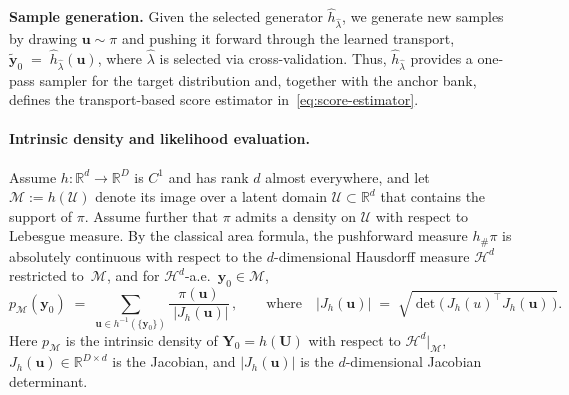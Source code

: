 \documentclass[12pt]{article}
\theoremstyle{definition} %
\newcommand{\M}{\mathcal{M}}
\newcommand{\U}{\bm U}
\newcommand{\Y}{\bm Y}
\newcommand{\y}{\bm y}
\begin{document}
\noindent\textbf{Sample generation.}
Given the selected generator $\hat h_{\hat\lambda}$, we generate new samples by drawing
$\bm u \sim \pi$ and pushing it forward through the learned transport,
$\tilde{\y}_0 \;=\; \hat h_{\hat\lambda}(\bm u)$,
where $\hat\lambda$ is selected via cross-validation.
Thus, $\hat h_{\hat\lambda}$ provides a one-pass sampler for the target distribution and, together with the anchor bank, defines the transport-based score estimator in~\eqref{eq:score-estimator}.

\paragraph{Intrinsic density and likelihood evaluation.}
Assume $h:\mathbb{R}^{d}\to\mathbb{R}^D$ is $C^1$ and has rank $d$ almost everywhere, and let $\M:=h(\mathcal{U})$ denote its image over a latent domain $\mathcal{U}\subset\mathbb{R}^{d}$ that contains the support of $\pi$.
Assume further that $\pi$ admits a density on $\mathcal{U}$ with respect to Lebesgue measure.
By the classical area formula, the pushforward measure $h_{\#}\pi$ is absolutely continuous with respect to the $d$-dimensional Hausdorff measure $\mathcal H^{d}$ restricted to~$\M$, and for $\mathcal H^{d}$-a.e.\ $\y_0\in\M$,
\begin{equation}
\label{eq:manifold-likelihood}
p_\M(\y_0)\;=\;\sum_{\bm u\in h^{-1}(\{\y_0\})} \frac{\pi(\bm u)}{\;\bigl|J_h(\bm u)\bigr|}\,,
\qquad \text{where}\quad \bigl|J_h(\bm u)\bigr|
\;=\; \sqrt{\det\!\bigl(\,J_h(u)^\top J_h(\bm u)\,\bigr)}.
\end{equation}
Here $p_\M$ is the intrinsic density of $\Y_0=h(\U)$ with respect to $\mathcal H^d|_{\M}$, $J_h(\bm u)\in\mathbb{R}^{D\times d}$ is the Jacobian, and $|J_h(\bm u)|$ is the $d$-dimensional Jacobian determinant.
\end{document}
